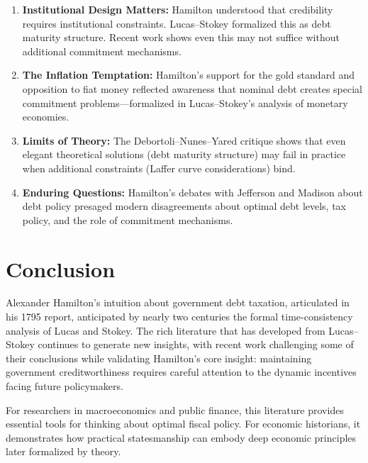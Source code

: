 \documentclass[12pt]{article}
\begin{document}
\begin{enumerate}
\item \textbf{Institutional Design Matters:} Hamilton understood that credibility requires institutional constraints. Lucas--Stokey formalized this as debt maturity structure. Recent work shows even this may not suffice without additional commitment mechanisms.

\item \textbf{The Inflation Temptation:} Hamilton's support for the gold standard and opposition to fiat money reflected awareness that nominal debt creates special commitment problems---formalized in Lucas--Stokey's analysis of monetary economies.

\item \textbf{Limits of Theory:} The Debortoli--Nunes--Yared critique shows that even elegant theoretical solutions (debt maturity structure) may fail in practice when additional constraints (Laffer curve considerations) bind.

\item \textbf{Enduring Questions:} Hamilton's debates with Jefferson and Madison about debt policy presaged modern disagreements about optimal debt levels, tax policy, and the role of commitment mechanisms.
\end{enumerate}

\section{Conclusion}

Alexander Hamilton's intuition about government debt taxation, articulated in his 1795 report, anticipated by nearly two centuries the formal time-consistency analysis of Lucas and Stokey. The rich literature that has developed from Lucas--Stokey continues to generate new insights, with recent work challenging some of their conclusions while validating Hamilton's core insight: maintaining government creditworthiness requires careful attention to the dynamic incentives facing future policymakers.

For researchers in macroeconomics and public finance, this literature provides essential tools for thinking about optimal fiscal policy. For economic historians, it demonstrates how practical statesmanship can embody deep economic principles later formalized by theory.



\end{document}
